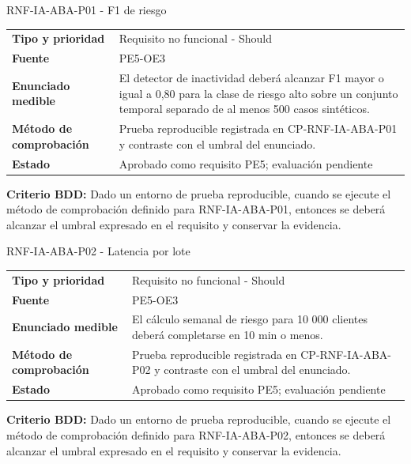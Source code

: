 \documentclass[11pt,a4paper]{article}
\begin{document}
\begin{reqbox}[colframe=Teal]{RNF-IA-ABA-P01 - F1 de riesgo}
\begin{tabularx}{\textwidth}{>{\bfseries}p{3.2cm}Y}
Tipo y prioridad & Requisito no funcional - Should \\
Fuente & PE5-OE3 \\
Enunciado medible & El detector de inactividad deberá alcanzar F1 mayor o igual a 0,80 para la clase de riesgo alto sobre un conjunto temporal separado de al menos 500 casos sintéticos. \\
Método de comprobación & Prueba reproducible registrada en CP-RNF-IA-ABA-P01 y contraste con el umbral del enunciado. \\
Estado & Aprobado como requisito PE5; evaluación pendiente \\
\end{tabularx}
\textbf{Criterio BDD:} Dado un entorno de prueba reproducible, cuando se ejecute el método de comprobación definido para RNF-IA-ABA-P01, entonces se deberá alcanzar el umbral expresado en el requisito y conservar la evidencia.
\end{reqbox}


\begin{reqbox}[colframe=Teal]{RNF-IA-ABA-P02 - Latencia por lote}
\begin{tabularx}{\textwidth}{>{\bfseries}p{3.2cm}Y}
Tipo y prioridad & Requisito no funcional - Should \\
Fuente & PE5-OE3 \\
Enunciado medible & El cálculo semanal de riesgo para 10 000 clientes deberá completarse en 10 min o menos. \\
Método de comprobación & Prueba reproducible registrada en CP-RNF-IA-ABA-P02 y contraste con el umbral del enunciado. \\
Estado & Aprobado como requisito PE5; evaluación pendiente \\
\end{tabularx}
\textbf{Criterio BDD:} Dado un entorno de prueba reproducible, cuando se ejecute el método de comprobación definido para RNF-IA-ABA-P02, entonces se deberá alcanzar el umbral expresado en el requisito y conservar la evidencia.
\end{reqbox}
\end{document}
